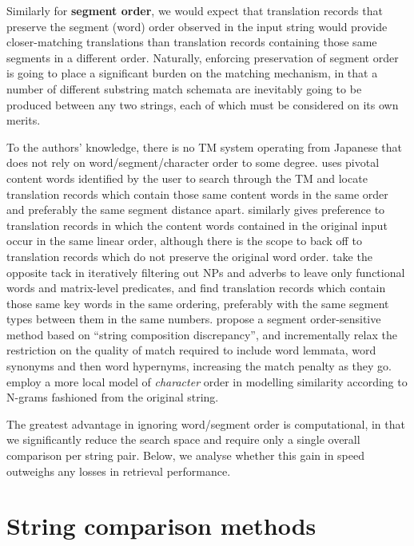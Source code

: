 Similarly for {\bf segment order}, we would expect that translation
records that preserve the segment (word) order observed in the input
string would provide closer-matching translations than translation
records containing those same segments in a different order. Naturally,
enforcing preservation of segment order is going to place a significant
burden on the matching mechanism, in that a number of different
substring match schemata are inevitably going to be produced between any
two strings, each of which must be considered on its own merits.

To the authors' knowledge, there is no TM system operating from Japanese
that does not rely on word/segment/character order to some degree.
 uses pivotal content words identified by the user to
search through the TM and locate translation records which contain those
same content words in the same order and preferably the same segment
distance apart.  similarly gives preference to
translation records in which the content words contained in the original
input occur in the same linear order, although there is the scope to
back off to translation records which do not preserve the original word
order.  take the opposite tack in iteratively
filtering out NPs and adverbs to leave only functional words and
matrix-level predicates, and find translation records which contain
those same key words in the same ordering, preferably with the same
segment types between them in the same numbers. 
propose a segment order-sensitive method based on ``string composition
discrepancy'', and incrementally relax the restriction on the quality of
match required to include word lemmata, word synonyms and then word
hypernyms, increasing the match penalty as they go.  
employ a more local model of {\it character} order in modelling
similarity according to N-grams fashioned from the original string.

The greatest advantage in ignoring word/segment order is computational,
in that we significantly reduce the search space and require only a
single overall comparison per string pair. Below, we analyse whether
this gain in speed outweighs any losses in retrieval performance.






\section{String comparison methods}
\label{sec:simmethods}

